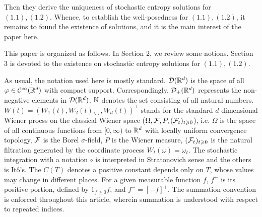 \documentclass[11pt]{article}
\def\geq{\geqslant}\def\leq{\leqslant}
\begin{document}
Then they derive the uniqueness of stochastic entropy solutions for
$(1.1), (1.2)$. Whence, to establish the well-posedness for $(1.1),
(1.2)$, it remains to found the existence of solutions, and it is
the main interest of the paper here.
  \vskip1mm\par
This paper is organized as follows. In Section 2, we review some
notions. Section 3 is devoted to the existence on stochastic entropy
solutions for $(1.1), (1.2)$.
   \vskip1mm\par
As usual, the notation used here is mostly standard. ${\mathcal D}({\mathbb R}^d)$ is
the space of all $\varphi\in {\mathcal C}^\infty({\mathbb R}^d)$ with compact
support. Correspondingly, ${\mathcal D}_+({\mathbb R}^d)$ represents the non-negative
elements in ${\mathcal D}({\mathbb R}^d)$. ${\mathbb N}$ denotes the set consisting of all
natural numbers. $W(t)=(W_1(t), W_2(t), _{\cdots}, W_d(t))^\top$
stands for the standard $d$-dimensional Wiener procss on the
classical Wiener space ($\Omega, \cF,P,(\cF_{t})_{t\geq 0}$), i.e.
$\Omega$ is the space of all continuous functions from $[0,\infty)$
to ${\mathbb R}^d$ with locally uniform convergence topology, ${\mathcal F}$ is the
Borel $\sigma$-field, $P$ is the Wiener measure, $(\cF_t)_{t\geq 0}$
is the natural filtration generated by the coordinate process
$W_t(\omega)=\omega_t$. The stochastic integration with a notation
$\circ$ is interpreted in Stratonovich sense and the others is
It\^{o}'s. The $C(T)$ denotes a positive constant depends only on
$T$, whose values may change in different places. For a given
measurable function $f$, $f^+$ is its positive portion, defined by
$1_{f\geq0}f$, and $f^-=[-f]^+$. The summation convention is
enforced throughout this article, wherein summation is understood
with respect to repeated indices.
\end{document}
